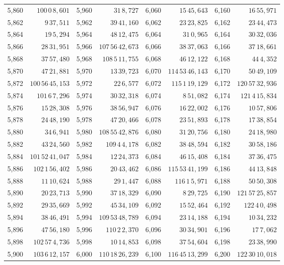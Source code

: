\begin{tabular}{|r|r||r|r||r|r||r|r|}
5,860 & \(100\,0\,8,\!601\) & 5,960 & \(31\,8,\!727\) & 6,060 & \(15\,45,\!643\) & 6,160 & \(16\,55,\!971\) \\[1pt]
5,862 & \(9\,37,\!511\) & 5,962 & \(39\,41,\!160\) & 6,062 & \(23\,23,\!825\) & 6,162 & \(23\,44,\!473\) \\
5,864 & \(19\,5,\!294\) & 5,964 & \(48\,12,\!475\) & 6,064 & \(31\,0,\!965\) & 6,164 & \(30\,32,\!036\) \\
5,866 & \(28\,31,\!951\) & 5,966 & \(107\,56\,42,\!673\) & 6,066 & \(38\,37,\!063\) & 6,166 & \(37\,18,\!661\) \\
5,868 & \(37\,57,\!480\) & 5,968 & \(108\,5\,11,\!755\) & 6,068 & \(46\,12,\!122\) & 6,168 & \(44\,4,\!352\) \\
5,870 & \(47\,21,\!881\) & 5,970 & \(13\,39,\!723\) & 6,070 & \(114\,53\,46,\!143\) & 6,170 & \(50\,49,\!109\) \\[1pt]
5,872 & \(100\,56\,45,\!153\) & 5,972 & \(22\,6,\!577\) & 6,072 & \(115\,1\,19,\!129\) & 6,172 & \(120\,57\,32,\!936\) \\
5,874 & \(101\,6\,7,\!296\) & 5,974 & \(30\,32,\!318\) & 6,074 & \(8\,51,\!082\) & 6,174 & \(121\,4\,15,\!834\) \\
5,876 & \(15\,28,\!308\) & 5,976 & \(38\,56,\!947\) & 6,076 & \(16\,22,\!002\) & 6,176 & \(10\,57,\!806\) \\
5,878 & \(24\,48,\!190\) & 5,978 & \(47\,20,\!466\) & 6,078 & \(23\,51,\!893\) & 6,178 & \(17\,38,\!854\) \\
5,880 & \(34\,6,\!941\) & 5,980 & \(108\,55\,42,\!876\) & 6,080 & \(31\,20,\!756\) & 6,180 & \(24\,18,\!980\) \\[1pt]
5,882 & \(43\,24,\!560\) & 5,982 & \(109\,4\,4,\!178\) & 6,082 & \(38\,48,\!594\) & 6,182 & \(30\,58,\!186\) \\
5,884 & \(101\,52\,41,\!047\) & 5,984 & \(12\,24,\!373\) & 6,084 & \(46\,15,\!408\) & 6,184 & \(37\,36,\!475\) \\
5,886 & \(102\,1\,56,\!402\) & 5,986 & \(20\,43,\!462\) & 6,086 & \(115\,53\,41,\!199\) & 6,186 & \(44\,13,\!848\) \\
5,888 & \(11\,10,\!624\) & 5,988 & \(29\,1,\!447\) & 6,088 & \(116\,1\,5,\!971\) & 6,188 & \(50\,50,\!308\) \\
5,890 & \(20\,23,\!713\) & 5,990 & \(37\,18,\!329\) & 6,090 & \(8\,29,\!725\) & 6,190 & \(121\,57\,25,\!857\) \\[1pt]
5,892 & \(29\,35,\!669\) & 5,992 & \(45\,34,\!109\) & 6,092 & \(15\,52,\!464\) & 6,192 & \(122\,4\,0,\!498\) \\
5,894 & \(38\,46,\!491\) & 5,994 & \(109\,53\,48,\!789\) & 6,094 & \(23\,14,\!188\) & 6,194 & \(10\,34,\!232\) \\
5,896 & \(47\,56,\!180\) & 5,996 & \(110\,2\,2,\!370\) & 6,096 & \(30\,34,\!901\) & 6,196 & \(17\,7,\!062\) \\
5,898 & \(102\,57\,4,\!736\) & 5,998 & \(10\,14,\!853\) & 6,098 & \(37\,54,\!604\) & 6,198 & \(23\,38,\!990\) \\
5,900 & \(103\,6\,12,\!157\) & 6,000 & \(110\,18\,26,\!239\) & 6,100 & \(116\,45\,13,\!299\) & 6,200 & \(122\,30\,10,\!018\) \\
\hline
\end{tabular}\par
\endgroup
\clearpage
